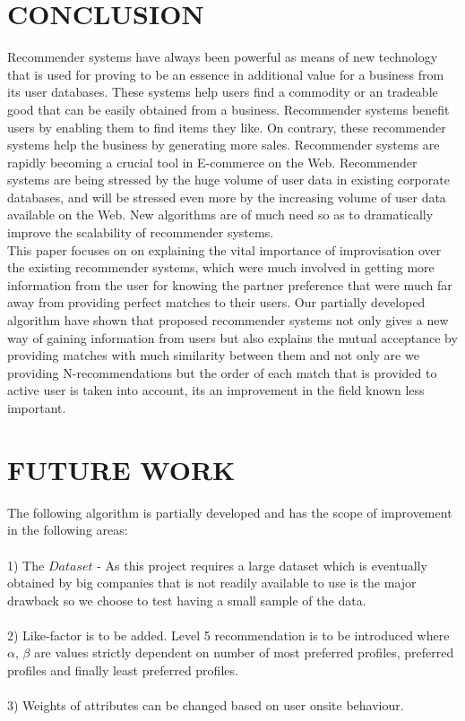 \documentclass[12pt,oneside]{book}
\begin{document}
\section{CONCLUSION}
Recommender systems have always been powerful as means of new technology that is used for proving to be an essence in  additional value for a business from its user databases. These systems help users find a commodity or an tradeable good that can be easily obtained from a business. Recommender systems benefit users by enabling them to find items they like. On contrary, these recommender systems help the business by generating more sales. Recommender systems are rapidly becoming a crucial tool in E-commerce on the Web. Recommender systems are being stressed by the huge volume of user data in existing corporate databases, and will be stressed even more by the increasing volume of user data available on the Web. New algorithms are of much need so as to dramatically improve the scalability of recommender systems.\\
This paper focuses on on explaining the vital importance of  improvisation over the existing recommender systems, which were much involved in getting more information from the user for knowing the partner preference that were much far away from providing perfect matches to their users. Our partially developed algorithm have shown that proposed recommender systems not only gives a new way of gaining information from users but also explains the mutual acceptance by providing matches with much similarity between them and not only are we providing N-recommendations but the order of each match that is provided to active user is taken into account, its an improvement in the field known less important.\\
\section{FUTURE WORK}
The following algorithm is partially developed and has the scope of improvement in the following areas:\\\\
1) The $Dataset$ - As this project requires a large dataset which is eventually obtained by big companies that is not readily available to use is the major drawback so we choose to test having a small sample of the data.\\\\
2) Like-factor is to be added. Level 5 recommendation is to be introduced where $\alpha$, $\beta$ are values strictly dependent on number of most preferred profiles, preferred profiles and finally least preferred profiles.\\\\
3) Weights of attributes can be changed based on user onsite behaviour.

\end{document}
